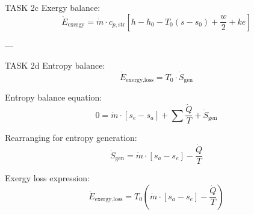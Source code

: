 TASK 2c  
Exergy balance:  
\[
\dot{E}_{\text{exergy}} = \dot{m} \cdot c_{p,\text{str}} \left[ h - h_0 - T_0(s - s_0) + \frac{w}{2} + ke \right]
\]  

---

TASK 2d  
Entropy balance:  
\[
\dot{E}_{\text{exergy,loss}} = T_0 \cdot \dot{S}_{\text{gen}}
\]  

Entropy balance equation:  
\[
0 = \dot{m} \cdot [s_e - s_a] + \sum \frac{\dot{Q}}{T} + \dot{S}_{\text{gen}}
\]  

Rearranging for entropy generation:  
\[
\dot{S}_{\text{gen}} = \dot{m} \cdot [s_a - s_e] - \frac{\dot{Q}}{T}
\]  

Exergy loss expression:  
\[
\dot{E}_{\text{exergy,loss}} = T_0 \left( \dot{m} \cdot [s_a - s_e] - \frac{\dot{Q}}{T} \right)
\]  